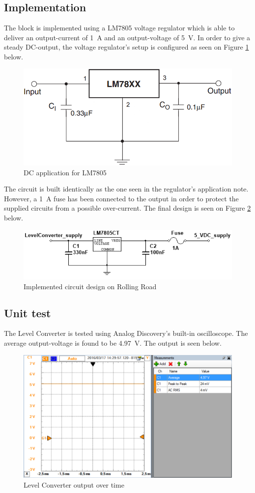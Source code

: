 \subsection{Implementation}
The block is implemented using a LM7805 voltage regulator\cite{LM7805} which is able to deliver an output-current of \SI{1}{\ampere} and an output-voltage of \SI{5}{\volt}. In order to give a steady DC-output, the voltage regulator's setup is configured as seen on Figure \ref{fig:LM7805_app} below.

\begin{figure}[H]
	\centering
	\includegraphics[width=0.4\linewidth]{Hardware/Pictures/LM7805}
	\caption{DC application for LM7805}
	\label{fig:LM7805_app}
\end{figure}

The circuit is built identically as the one seen in the regulator's application note. However, a \SI{1}{\ampere} fuse has been connected to the output in order to protect the supplied circuits from a possible over-current. The final design is seen on Figure \ref{fig:DesignLevelConverter} below.

\begin{figure}[H]
	\centering
	\includegraphics[width=0.7\linewidth]{Hardware/Pictures/DesignLevelConverter}
	\caption{Implemented circuit design on Rolling Road}
	\label{fig:DesignLevelConverter}
\end{figure}

\subsection{Unit test}
The Level Converter is tested using Analog Discovery's built-in oscilloscope. The average output-voltage is found to be \SI{4.97}{\volt}. The output is seen below. 

\begin{figure}[H]
	\centering
	\includegraphics[width=0.9\linewidth]{Hardware/Pictures/LevelConverter_test}
	\caption{Level Converter output over time}
	\label{fig:LevelConverter_test}
\end{figure}